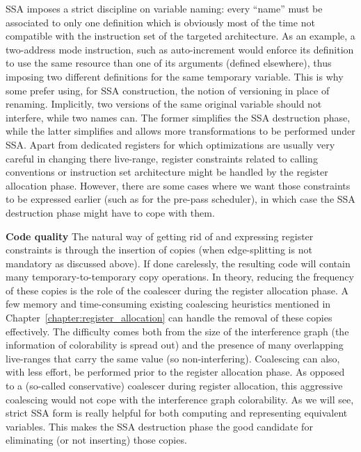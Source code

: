 SSA imposes a strict discipline on variable naming: every ``name'' must be associated to only one definition which is obviously most of the time not compatible with the instruction set of the targeted architecture. As an example, a two-address mode instruction, such as auto-increment would enforce its definition to use the same resource than one of its arguments (defined elsewhere), thus imposing two different definitions for the same temporary variable. This is why some prefer using, for SSA construction, the notion of versioning in place of renaming. Implicitly, two versions of the same original variable should not interfere, while two names can. The former simplifies the SSA destruction phase, while the latter simplifies and allows more transformations to be performed under SSA. Apart from dedicated registers for which optimizations are usually very careful in changing there live-range, register constraints related to calling conventions or instruction set architecture might be handled by the register allocation phase. However, there are some cases where we want those constraints to be expressed earlier (such as for the pre-pass scheduler), in which case the SSA destruction phase might have to cope with them.

{\bf Code quality}
The natural way of getting rid of \phifuns and expressing register constraints is through the insertion of copies (when edge-splitting is not mandatory as discussed above). If done carelessly, the resulting code will contain many temporary-to-temporary copy operations. In theory, reducing the frequency of these copies is the role of the coalescer during the register allocation phase.
A few memory and time-consuming existing coalescing heuristics mentioned in Chapter~\ref{chapter:register_allocation} can handle the removal of these copies effectively. The difficulty comes both from the size of the interference graph (the information of colorability is spread out) and the presence of many overlapping live-ranges that carry the same value (so non-interfering).
Coalescing can also, with less effort, be performed prior to the register allocation phase. As opposed to a (so-called conservative) coalescer during register allocation, this aggressive coalescing would not cope with the interference graph colorability. As we will see, strict SSA form is really helpful for both computing and representing equivalent variables. This makes the SSA destruction phase the good candidate for eliminating (or not inserting) those copies.

